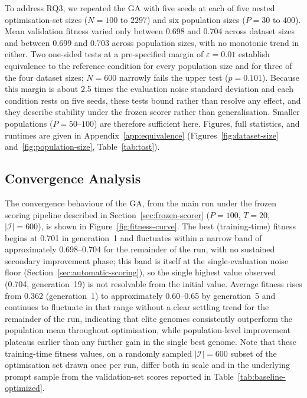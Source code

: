 \documentclass[mathematics,article,submit,xetex,moreauthors]{Definitions/mdpi}
\begin{document}
To address RQ3, we repeated the GA with five seeds at each of five nested
optimisation-set sizes ($N=100$ to $2297$) and six population sizes ($P=30$ to
$400$). Mean validation fitness varied only between 0.698 and 0.704 across
dataset sizes and between 0.699 and 0.703 across population sizes, with no
monotonic trend in either. Two one-sided tests at a pre-specified margin of
$\varepsilon=0.01$ establish equivalence to the reference condition for every
population size and for three of the four dataset sizes; $N=600$ narrowly
fails the upper test ($p=0.101$). Because this margin is about 2.5 times the
evaluation noise standard deviation and each condition rests on five seeds,
these tests bound rather than resolve any effect, and they describe stability
under the frozen scorer rather than generalisation. Smaller populations
($P=50$--$100$) are therefore sufficient here. Figures, full statistics, and
runtimes are given in Appendix~\ref{app:equivalence}
(Figures~\ref{fig:dataset-size} and~\ref{fig:population-size},
Table~\ref{tab:tost}).

\subsection{Convergence Analysis}

The convergence behaviour of the GA, from the main run under the frozen scoring pipeline described in Section~\ref{sec:frozen-scorer}
($P=100$, $T=20$, $|\mathcal{I}|=600$), is shown in
Figure~\ref{fig:fitness-curve}. The best (training-time) fitness begins
at 0.701 in generation~1 and fluctuates within a narrow band of approximately
0.698--0.704 for the remainder of the run, with no sustained secondary
improvement phase; this band is itself at the single-evaluation noise floor
(Section~\ref{sec:automatic-scoring}), so the single highest value observed
(0.704, generation~19)
is not resolvable from the initial value. Average fitness rises from 0.362
(generation~1) to approximately 0.60--0.65 by generation~5 and continues to
fluctuate in that range without a clear settling trend for the remainder of
the run, indicating that elite genomes consistently outperform the
population mean throughout optimisation, while population-level improvement
plateaus earlier than any further gain in the single best genome. Note that
these training-time fitness values, on a randomly sampled $|\mathcal{I}|=600$
subset of the optimisation set drawn once per run, differ both in scale
and in the underlying prompt sample from the validation-set scores reported
in Table~\ref{tab:baseline-optimized}.
\end{document}
